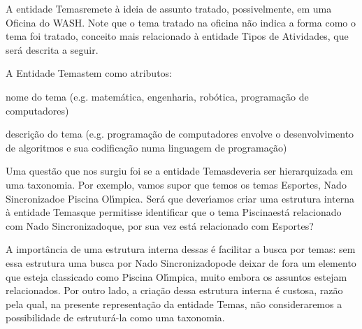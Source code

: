 \documentclass[
12pt,		%
openright,	%
twoside,  %
a4paper,			%
chapter=TITLE,		%
english,			%
french,				%
spanish,			%
brazil				%
]{USPSC-classe/USPSC}
\begin{document}
\noindent\begin{center}\mbox{\centering{}}\end{center}


A entidade \textquotedbl Temas\textquotedbl  remete \`a ideia de assunto tratado, possivelmente, em uma Oficina do WASH. Note que o tema tratado na oficina n\~ao indica a forma como o tema foi tratado, conceito mais relacionado \`a entidade \textquotedbl Tipos de Atividades\textquotedbl , que ser\'a descrita a seguir.




A Entidade \textquotedbl Temas\textquotedbl  tem como atributos:





\begin{alineas}
\item nome do tema (e.g. matem\'atica, engenharia, rob\'otica, programa\c{c}\~ao de computadores)
\item descri\c{c}\~ao do tema (e.g. \textquotedbl programa\c{c}\~ao de computadores envolve o desenvolvimento de algoritmos e sua codifica\c{c}\~ao numa linguagem de programa\c{c}\~ao\textquotedbl )
\end{alineas}

Uma quest\~ao que nos surgiu foi se a entidade \textquotedbl Temas\textquotedbl  deveria ser hierarquizada em uma taxonomia. Por exemplo, vamos supor que temos os temas \textquotedbl Esportes\textquotedbl , \textquotedbl Nado Sincronizado\textquotedbl  e \textquotedbl Piscina Ol\'{\i}mpica\textquotedbl . Ser\'a que dever\'{\i}amos criar uma estrutura interna \`a entidade \textquotedbl Temas\textquotedbl  que permitisse identificar que o tema \textquotedbl Piscina\textquotedbl  est\'a relacionado com \textquotedbl Nado Sincronizado\textquotedbl  que, por sua vez est\'a relacionado com \textquotedbl Esportes\textquotedbl ?




A import\^ancia de uma estrutura interna dessas \'e facilitar a busca por temas: sem essa estrutura uma busca por \textquotedbl Nado Sincronizado\textquotedbl  pode deixar de fora um elemento que esteja classicado como \textquotedbl Piscina Ol\'{\i}mpica\textquotedbl , muito embora os assuntos estejam relacionados. Por outro lado, a cria\c{c}\~ao dessa estrutura interna \'e custosa, raz\~ao pela qual, na presente representa\c{c}\~ao da entidade \textquotedbl Temas\textquotedbl , n\~ao consideraremos a possibilidade de estrutur\'a-la como uma taxonomia.
\end{document}
